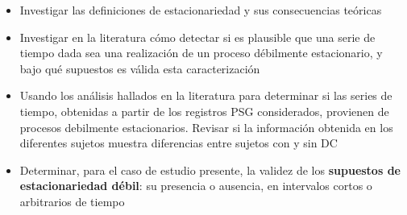 \begin{itemize}

\item Investigar las definiciones de estacionariedad y sus consecuencias te\'oricas

\item Investigar en la literatura c\'omo detectar si es plausible que una serie de tiempo 
dada sea una realizaci\'on de un proceso d\'ebilmente estacionario, 
y bajo qu\'e supuestos es v\'alida esta caracterizaci\'on

\item Usando los an\'alisis hallados en la literatura para determinar si las series de tiempo,
obtenidas a partir de los registros PSG considerados, provienen de procesos
debilmente estacionarios.
Revisar si la informaci\'on obtenida en los diferentes sujetos muestra diferencias entre
sujetos con y sin DC

\item Determinar, para el caso de estudio presente, la validez de los \textbf{supuestos de 
estacionariedad d\'ebil}: su presencia o ausencia, en intervalos cortos o arbitrarios de tiempo
\end{itemize}

